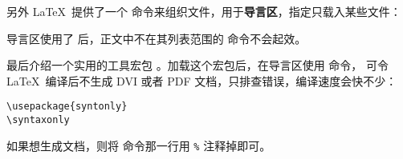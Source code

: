 另外 \LaTeX\ 提供了一个  命令来组织文件，用于\textbf{导言区}，指定只载入某些文件：
\begin{command}
\end{command}

导言区使用了  后，正文中不在其列表范围的  命令不会起效。

最后介绍一个实用的工具宏包 。加载这个宏包后，在导言区使用  命令，
可令 \LaTeX\ 编译后不生成 DVI 或者 PDF 文档，只排查错误，编译速度会快不少：
\begin{verbatim}
\usepackage{syntonly}
\syntaxonly
\end{verbatim}

如果想生成文档，则将  命令那一行用 \texttt\% 注释掉即可。

\endinput